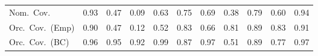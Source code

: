 \begin{table}[!htbp]
{\begin{tabular}{lrrrrrrrrrr}
\quad Nom.\ Cov. & \cellcolor{ranktwo}0.93 & 0.47 & 0.09 & 0.63 & 0.75 & 0.69 & 0.38 & \cellcolor{rankthree}0.79 & 0.60 & \cellcolor{rankone}0.94 \\
\quad Orc.\ Cov.\ (Emp) & \cellcolor{ranktwo}0.90 & 0.47 & 0.12 & 0.52 & 0.83 & 0.66 & 0.81 & \cellcolor{rankthree}0.89 & 0.83 & \cellcolor{rankone}0.91 \\
\quad Orc.\ Cov.\ (BC) & \cellcolor{ranktwo}0.96 & \cellcolor{rankone}0.95 & 0.92 & 0.99 & 0.87 & \cellcolor{rankthree}0.97 & 0.51 & 0.89 & 0.77 & 0.97 \\
\bottomrule
\end{tabular}}
\end{table}

